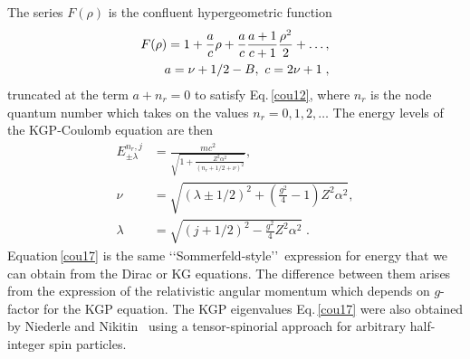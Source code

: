 \documentclass[epj]{svjour}
\begin{document}
The series $F(\rho)$ is the confluent hypergeometric function 
\begin{alignat}{1}
\label{cou16} F(\rho)=1+\frac{a}{c}\rho+\frac{a}{c}\frac{a+1}{c+1}\frac{\rho^{2}}{2}+\ldots,\\
\notag a=\nu+1/2-B,\ c=2\nu+1\;,\end{alignat}
truncated at the term $a+n_{r}=0$ to satisfy Eq.\,\eqref{cou12}, where $n_{r}$ is the node quantum number which takes on the values $n_{r}=0,1,2,\ldots$ The energy levels of the KGP-Coulomb equation are then
\begin{subequations}
\begin{alignat}{1}
\label{cou17} E_{\pm\lambda}^{n_{r},j}&=\frac{mc^{2}}{\sqrt{1+\displaystyle\frac{Z^{2}\alpha^{2}}{\left(n_{r}+1/2+\nu\right)^{2}}}},\\[0.2cm]
\label{cou17b} \nu&=\sqrt{(\lambda\pm1/2)^{2}+\left(\frac{g^{2}}{4}-1\right)Z^{2}\alpha^{2}},\\[0.2cm]
\label{cou17c} \lambda&=\sqrt{\displaystyle(j+1/2)^{2}-\frac{\displaystyle g^{2}}{4}Z^{2}\alpha^{2}}\;.
\end{alignat}
\end{subequations}
Equation\,\eqref{cou17} is the same \lq\lq Sommerfeld-style\rq\rq\ expression for energy that we can obtain from the Dirac or KG equations. The difference between them arises from the expression of the relativistic angular momentum which depends on $g$-factor for the KGP equation. The KGP eigenvalues Eq.\,\eqref{cou17} were also obtained by Niederle and Nikitin~\cite{Niederle:2004bx} using a tensor-spinorial approach for arbitrary half-integer spin particles.

\end{document}
